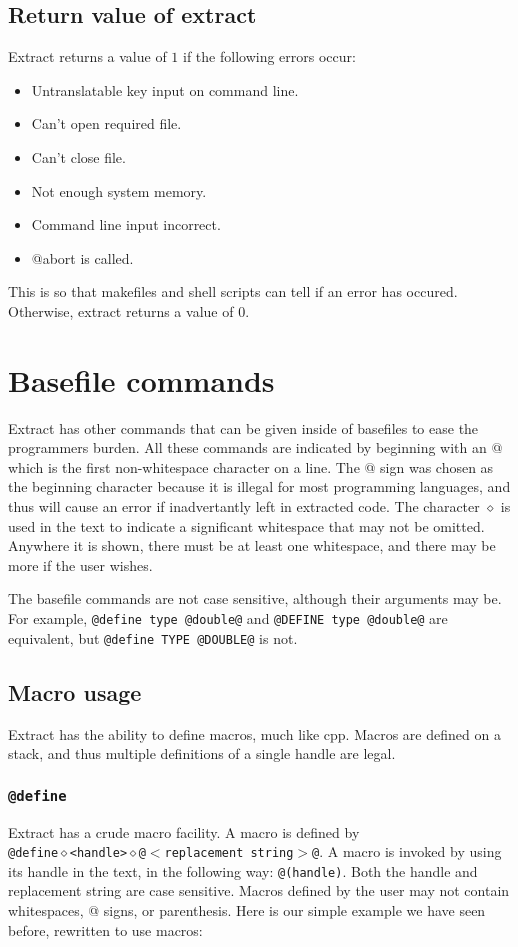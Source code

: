 \subsection{Return value of extract} Extract returns a value of $1$ if 
the following errors occur: 
\begin{itemize}
\item Untranslatable key input on command line.
\item Can't open required file.
\item Can't close file.
\item Not enough system memory.
\item Command line input incorrect.
\item @abort is called.
\end{itemize}
This is so that makefiles and shell scripts can tell if an error has occured.
Otherwise, extract returns a value of $0$.

\section{Basefile commands}
Extract has other commands that can be given inside of basefiles to ease the
programmers burden.  All these commands are indicated by beginning with an @ 
which is the first non-whitespace character on a line.  The @ sign was
chosen as the beginning character because it is illegal for most programming
languages, and thus will cause an error if inadvertantly left in extracted 
code. The character
$\diamond$ is used in the text to indicate a significant whitespace that
may not be omitted.  Anywhere it is shown, there must be at least one
whitespace, and there may be more if the user wishes.

The basefile commands are not case sensitive, although their arguments
may be.  For example, {\tt @define type @double@} and 
{\tt @DEFINE type @double@} are equivalent, but {\tt @define TYPE @DOUBLE@}
is not.

\subsection{Macro usage}
Extract has the ability to define macros, much like cpp.  Macros are defined on
a stack, and thus multiple definitions of a single handle are legal.
\subsubsection{\tt @define}
Extract has a crude macro facility.  A macro is defined by\\
{\tt @define$\diamond$<handle>$\diamond$@$<$replacement string$>$@}.  
A macro is invoked by using its handle in the text, in the following way: 
{\tt @(handle)}.  Both the handle and replacement string are case sensitive.
Macros defined by the user may not contain whitespaces, @ signs, or parenthesis.
Here is our simple example we have seen before, rewritten to use macros:

